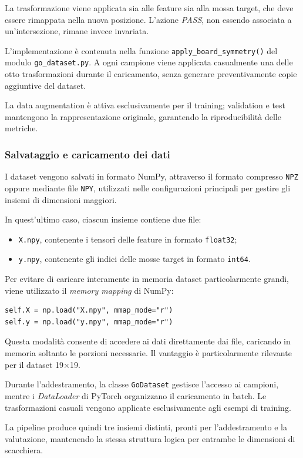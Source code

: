 La trasformazione viene applicata sia alle feature sia alla mossa target, che deve essere rimappata nella nuova posizione. L'azione \textit{PASS}, non essendo associata a un'intersezione, rimane invece invariata.

L'implementazione è contenuta nella funzione \texttt{apply\_board\_symmetry()} del modulo \texttt{go\_dataset.py}. A ogni campione viene applicata casualmente una delle otto trasformazioni durante il caricamento, senza generare preventivamente copie aggiuntive del dataset.

La data augmentation è attiva esclusivamente per il training; validation e test mantengono la rappresentazione originale, garantendo la riproducibilità delle metriche.

\subsubsection{Salvataggio e caricamento dei dati}

I dataset vengono salvati in formato NumPy, attraverso il formato compresso \texttt{NPZ} oppure mediante file \texttt{NPY}, utilizzati nelle configurazioni principali per gestire gli insiemi di dimensioni maggiori.

In quest'ultimo caso, ciascun insieme contiene due file:

\begin{itemize}
    \item \texttt{X.npy}, contenente i tensori delle feature in formato \texttt{float32};
    \item \texttt{y.npy}, contenente gli indici delle mosse target in formato \texttt{int64}.
\end{itemize}

Per evitare di caricare interamente in memoria dataset particolarmente grandi, viene utilizzato il \textit{memory mapping} di NumPy:

\begin{verbatim}
self.X = np.load("X.npy", mmap_mode="r")
self.y = np.load("y.npy", mmap_mode="r")
\end{verbatim}

Questa modalità consente di accedere ai dati direttamente dai file, caricando in memoria soltanto le porzioni necessarie. Il vantaggio è particolarmente rilevante per il dataset 19$\times$19.

Durante l'addestramento, la classe \texttt{GoDataset} gestisce l'accesso ai campioni, mentre i \textit{DataLoader} di PyTorch organizzano il caricamento in batch. Le trasformazioni casuali vengono applicate esclusivamente agli esempi di training.

La pipeline produce quindi tre insiemi distinti, pronti per l'addestramento e la valutazione, mantenendo la stessa struttura logica per entrambe le dimensioni di scacchiera.
